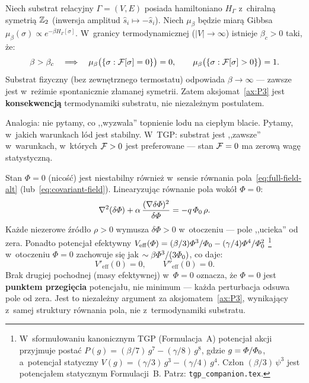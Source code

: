 \begin{proposition}\label{prop:P3-deriv}
Niech substrat relacyjny $\Gamma = (V, E)$ posiada hamiltoniano
$H_\Gamma$ z~chiralną symetri\k{a} $\mathbb{Z}_2$ (inwersja amplitud
$\hat{s}_i \mapsto -\hat{s}_i$). Niech $\mu_\beta$ b\k{e}dzie
miar\k{a} Gibbsa $\mu_\beta(\sigma) \propto e^{-\beta H_\Gamma[\sigma]}$.
W~granicy termodynamicznej ($|V| \to \infty$) istnieje
$\beta_c > 0$ taki, \.ze:
\begin{equation}
    \beta > \beta_c
    \quad\Longrightarrow\quad
    \mu_\beta\bigl(\{\sigma: \mathcal{F}[\sigma] = 0\}\bigr) = 0,
    \qquad
    \mu_\beta\bigl(\{\sigma: \mathcal{F}[\sigma] > 0\}\bigr) = 1.
\end{equation}
Substrat fizyczny (bez zewn\k{e}trznego termostatu) odpowiada
$\beta \to \infty$ --- zawsze jest w~re\.zimie spontanicznie
z\l{}amanej symetrii. Zatem aksjomat~\ref{ax:P3} jest
\textbf{konsekwencj\k{a}} termodynamiki substratu,
nie niezale\.znym postulatem.
\end{proposition}

Analogia: nie pytamy, co ,,wyzwala'' topnienie lodu na ciep\l{}ym blacie.
Pytamy, w~jakich warunkach l\'od jest stabilny. W~TGP: substrat
jest ,,zawsze'' w~warunkach, w~kt\'orych $\mathcal{F} > 0$
jest preferowane --- stan $\mathcal{F} = 0$ ma zerow\k{a} wag\k{e}
statystyczn\k{a}.

\begin{proposition}\label{prop:P3-action}
Stan $\Phi = 0$ (nicość) jest niestabilny r\'ownie\.z
w~sensie r\'ownania pola~\eqref{eq:full-field-alt}
(lub~\eqref{eq:covariant-field}). Linearyzuj\k{a}c
r\'ownanie pola wok\'o\l{} $\Phi = 0$:
\begin{equation}\label{eq:P3-lin}
    \nabla^2(\delta\varPhi) + \alpha\,\frac{(\nabla\delta\varPhi)^2}
    {\delta\varPhi} = -q\,\varPhi_0\,\rho.
\end{equation}
Ka\.zde niezerowe \'zr\'od\l{}o $\rho > 0$ wymusza
$\delta\Phi > 0$ w~otoczeniu --- pole ,,ucieka'' od zera.
Ponadto potencja\l{} efektywny
$V_{\mathrm{eff}}(\varPhi) = (\beta/3)\varPhi^3/\varPhi_0
- (\gamma/4)\varPhi^4/\varPhi_0^2$%
\footnote{W~sformu\l{}owaniu kanonicznym TGP (Formulacja~A) potencja\l{} akcji
przyjmuje posta\'c $P(g) = (\beta/7)\,g^7 - (\gamma/8)\,g^8$, gdzie $g = \varPhi/\varPhi_0$,
a~potencja\l{} statyczny $V(g) = (\gamma/3)\,g^3 - (\gamma/4)\,g^4$.
Cz\l{}on $(\beta/3)\,\psi^3$ jest potencja\l{}em statycznym Formulacji~B.
Patrz: \texttt{tgp\_companion.tex}.}
w~otoczeniu $\Phi = 0$
zachowuje si\k{e} jak $\sim\beta\varPhi^3/(3\varPhi_0)$, co daje:
\begin{equation}
    V'_{\mathrm{eff}}(0) = 0, \qquad
    V''_{\mathrm{eff}}(0) = 0.
\end{equation}
Brak drugiej pochodnej (masy efektywnej) w~$\Phi = 0$
oznacza, \.ze $\Phi = 0$ jest \textbf{punktem przegi\k{e}cia}
potencja\l{}u, nie minimum --- ka\.zda perturbacja
odsuwa pole od zera. Jest to niezale\.zny argument za
aksjomatem~\ref{ax:P3}, wynikaj\k{a}cy z~samej
struktury r\'ownania pola, nie z~termodynamiki substratu.
\end{proposition}

